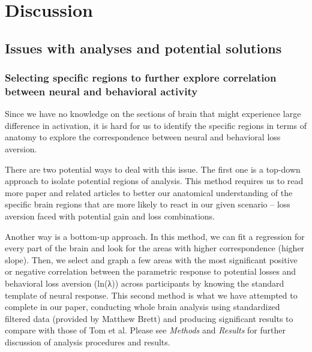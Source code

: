 \documentclass[11pt]{article}
\begin{document}
\newpage


\section{Discussion}

\subsection{Issues with analyses and potential solutions}

\subsubsection{Selecting specific regions to further explore 
correlation between neural and behavioral activity}

\indent Since we have no knowledge on the sections of brain that might 
experience large difference in activation, it is hard for us to identify the 
specific regions in terms of anatomy to explore the correspondence between 
neural and behavioral loss aversion.

There are two potential ways to deal with this issue. The first one is a 
top-down approach to isolate potential regions of analysis. This method 
requires us to read more paper and related articles to better our anatomical 
understanding of the specific brain regions that are more likely to react in our 
given scenario -- loss aversion faced with potential gain and loss combinations.

Another way is a bottom-up approach. In this method, we can fit a regression for 
every part of the brain and look for the areas with higher correspondence 
(higher slope). Then, we select and graph a few areas with the most significant 
positive or negative correlation between the parametric response to potential 
losses and behavioral loss aversion (ln(λ)) across participants by knowing the 
standard template of neural response. This second method is what we have 
attempted to complete in our paper, conducting whole brain analysis using 
standardized filtered data (provided by Matthew Brett) and producing 
significant results to compare with those of Tom et al. Please see 
\textit{Methods} and \textit{Results} for further discussion of analysis 
procedures and results. 
\end{document}
